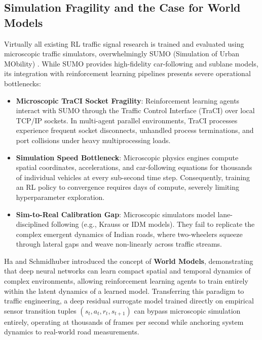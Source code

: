\documentclass[12pt,a4paper,oneside]{report}
\begin{document}
\subsection{Simulation Fragility and the Case for World Models}
Virtually all existing RL traffic signal research is trained and evaluated using microscopic traffic simulators, overwhelmingly SUMO (Simulation of Urban MObility) \cite{ref_sumo2018}. While SUMO provides high-fidelity car-following and sublane models, its integration with reinforcement learning pipelines presents severe operational bottlenecks:
\begin{itemize}
    \item \textbf{Microscopic TraCI Socket Fragility}: Reinforcement learning agents interact with SUMO through the Traffic Control Interface (TraCI) over local TCP/IP sockets. In multi-agent parallel environments, TraCI processes experience frequent socket disconnects, unhandled process terminations, and port collisions under heavy multiprocessing loads.
    \item \textbf{Simulation Speed Bottleneck}: Microscopic physics engines compute spatial coordinates, accelerations, and car-following equations for thousands of individual vehicles at every sub-second time step. Consequently, training an RL policy to convergence requires days of compute, severely limiting hyperparameter exploration.
    \item \textbf{Sim-to-Real Calibration Gap}: Microscopic simulators model lane-disciplined following (e.g., Krauss or IDM models). They fail to replicate the complex emergent dynamics of Indian roads, where two-wheelers squeeze through lateral gaps and weave non-linearly across traffic streams.
\end{itemize}

Ha and Schmidhuber \cite{ref_worldmodels2018} introduced the concept of \textbf{World Models}, demonstrating that deep neural networks can learn compact spatial and temporal dynamics of complex environments, allowing reinforcement learning agents to train entirely within the latent dynamics of a learned model. Transferring this paradigm to traffic engineering, a deep residual surrogate model trained directly on empirical sensor transition tuples $(s_t, a_t, r_t, s_{t+1})$ can bypass microscopic simulation entirely, operating at thousands of frames per second while anchoring system dynamics to real-world road measurements.
\end{document}
